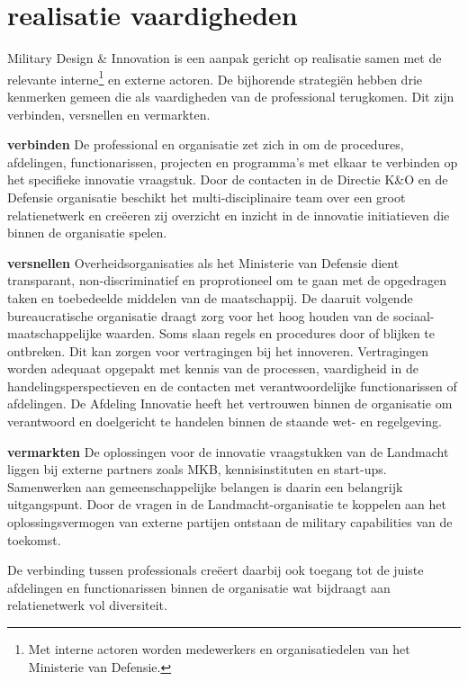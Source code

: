 \documentclass[
]{book}
\begin{document}
\hypertarget{realisatie-vaardigheden}{%
\section{realisatie vaardigheden}\label{realisatie-vaardigheden}}

Military Design \& Innovation is een aanpak gericht op realisatie samen met de relevante interne\footnote{Met interne actoren worden medewerkers en organisatiedelen van het Ministerie van Defensie.} en externe actoren. De bijhorende strategiën hebben drie kenmerken gemeen die als vaardigheden van de professional terugkomen. Dit zijn verbinden, versnellen en vermarkten.

\textbf{verbinden}
De professional en organisatie zet zich in om de procedures, afdelingen, functionarissen, projecten en programma's met elkaar te verbinden op het specifieke innovatie vraagstuk. Door de contacten in de Directie K\&O en de Defensie organisatie beschikt het multi-disciplinaire team over een groot relatienetwerk en creëeren zij overzicht en inzicht in de innovatie initiatieven die binnen de organisatie spelen.

\textbf{versnellen}
Overheidsorganisaties als het Ministerie van Defensie dient transparant, non-discriminatief en proprotioneel om te gaan met de opgedragen taken en toebedeelde middelen van de maatschappij. De daaruit volgende bureaucratische organisatie draagt zorg voor het hoog houden van de sociaal-maatschappelijke waarden. Soms slaan regels en procedures door of blijken te ontbreken. Dit kan zorgen voor vertragingen bij het innoveren. Vertragingen worden adequaat opgepakt met kennis van de processen, vaardigheid in de handelingsperspectieven en de contacten met verantwoordelijke functionarissen of afdelingen. De Afdeling Innovatie heeft het vertrouwen binnen de organisatie om verantwoord en doelgericht te handelen binnen de staande wet- en regelgeving.

\textbf{vermarkten}
De oplossingen voor de innovatie vraagstukken van de Landmacht liggen bij externe partners zoals MKB, kennisinstituten en start-ups. Samenwerken aan gemeenschappelijke belangen is daarin een belangrijk uitgangspunt. Door de vragen in de Landmacht-organisatie te koppelen aan het oplossingsvermogen van externe partijen ontstaan de military capabilities van de toekomst.

De verbinding tussen professionals creëert daarbij ook toegang tot de juiste afdelingen en functionarissen binnen de organisatie wat bijdraagt aan relatienetwerk vol diversiteit.
\end{document}
